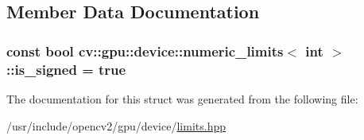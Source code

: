 \subsection{Member Data Documentation}
\hypertarget{structcv_1_1gpu_1_1device_1_1numeric__limits_3_01int_01_4_af965f3054cdb0e81265f71161434f5ec}{
\subsubsection[{is\-\_\-signed}]{\setlength{\rightskip}{0pt plus 5cm}const bool {\bf cv\-::gpu\-::device\-::numeric\-\_\-limits}$<$ int $>$\-::is\-\_\-signed = {\bf true}\hspace{0.3cm}{\ttfamily [static]}}}\label{structcv_1_1gpu_1_1device_1_1numeric__limits_3_01int_01_4_af965f3054cdb0e81265f71161434f5ec}


The documentation for this struct was generated from the following file\-:\begin{DoxyCompactItemize}
\item 
/usr/include/opencv2/gpu/device/\hyperlink{limits_8hpp}{limits.\-hpp}\end{DoxyCompactItemize}
